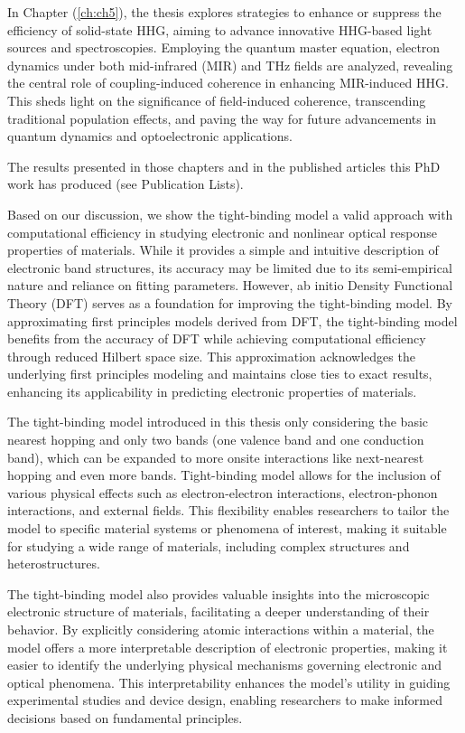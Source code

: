 In Chapter (\ref{ch:ch5}), the thesis explores strategies to enhance or suppress the efficiency of solid-state HHG, aiming to advance innovative HHG-based light sources and spectroscopies. Employing the quantum master equation, electron dynamics under both mid-infrared (MIR) and THz fields are analyzed, revealing the central role of coupling-induced coherence in enhancing MIR-induced HHG. This sheds light on the significance of field-induced coherence, transcending traditional population effects, and paving the way for future advancements in quantum dynamics and optoelectronic applications.

\color{red}
The results presented in those chapters and in the published articles this PhD work has produced (see Publication Lists).

Based on our discussion, we show the tight-binding model a valid approach with computational efficiency in studying electronic and nonlinear optical response properties of materials. While it provides a simple and intuitive description of electronic band structures, its accuracy may be limited due to its semi-empirical nature and reliance on fitting parameters. However, ab initio Density Functional Theory (DFT) serves as a foundation for improving the tight-binding model. By approximating first principles models derived from DFT, the tight-binding model benefits from the accuracy of DFT while achieving computational efficiency through reduced Hilbert space size. This approximation acknowledges the underlying first principles modeling and maintains close ties to exact results, enhancing its applicability in predicting electronic properties of materials.

The tight-binding model introduced in this thesis only considering the basic nearest hopping and only two bands (one valence band and one conduction band), which can be expanded to more onsite interactions like next-nearest hopping and even more bands. Tight-binding model allows for the inclusion of various physical effects such as electron-electron interactions, electron-phonon interactions, and external fields. This flexibility enables researchers to tailor the model to specific material systems or phenomena of interest, making it suitable for studying a wide range of materials, including complex structures and heterostructures.

The tight-binding model also provides valuable insights into the microscopic electronic structure of materials, facilitating a deeper understanding of their behavior. By explicitly considering atomic interactions within a material, the model offers a more interpretable description of electronic properties, making it easier to identify the underlying physical mechanisms governing electronic and optical phenomena. This interpretability enhances the model's utility in guiding experimental studies and device design, enabling researchers to make informed decisions based on fundamental principles.

